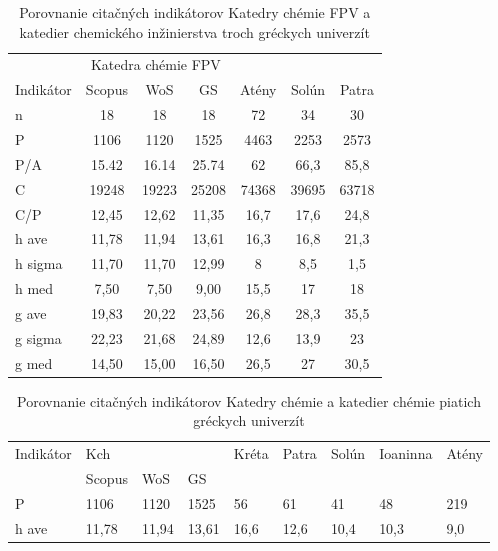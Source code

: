 \begin{SCtable}
  \label{tab:kazakis.results}

  \caption[Porovnanie Katedry chémie a katedier chemického inžinierstva troch gréckych univerzít]
  {Porovnanie citačných indikátorov Katedry chémie FPV a katedier chemického inžinierstva troch gréckych univerzít \citep{Kazakis2015}}
\begin{tabular}{lcccccc}
\toprule\noalign{\vspace{.3ex}}
           & \multicolumn{3}{c}{Katedra chémie FPV} & \multicolumn{3}{c}{\citet{Kazakis2015}}  \\
 Indikátor & Scopus & WoS   & GS    &  Atény     & Solún      & Patra      \\[0.3ex]
\midrule\noalign{\vspace{.5ex}}
 n         & 18     & 18    & 18    & 72    & 34    & 30    \\
 P         & 1106   & 1120  & 1525  & 4463  & 2253  & 2573  \\
 P/A       & 15.42  & 16.14 & 25.74 & 62    & 66,3  & 85,8  \\
 C         & 19248  & 19223 & 25208 & 74368 & 39695 & 63718 \\
 C/P       & 12,45  & 12,62 & 11,35 & 16,7  & 17,6  & 24,8  \\[1ex]
 h ave     & 11,78  & 11,94 & 13,61 & 16,3  & 16,8  & 21,3  \\
 h sigma   & 11,70  & 11,70 & 12,99 & 8     & 8,5   & 1,5   \\
 h med     & 7,50   & 7,50  & 9,00  & 15,5  & 17    & 18    \\
 g ave     & 19,83  & 20,22 & 23,56 & 26,8  & 28,3  & 35,5  \\
 g sigma   & 22,23  & 21,68 & 24,89 & 12,6  & 13,9  & 23    \\
 g med     & 14,50  & 15,00 & 16,50 & 26,5  & 27    & 30,5  \\[0.5ex]
\bottomrule
\end{tabular}
\end{SCtable}

\begin{table}
  \label{tab:lazaridis.results}
  \caption[Porovnanie Katedry chémie a chemických katedier vybraných gréckych univerzít]
  {Porovnanie citačných indikátorov Katedry chémie a katedier chémie piatich gréckych univerzít \citep{Lazaridis2010}}
\begin{tabular}{lllllll}
\hline
 Indikátor & Kch    &       &       & Kréta & Patra & Solún & Ioaninna & Atény \\
           & Scopus & WoS   & GS    &       &       &       &          &       \\
 P         & 1106   & 1120  & 1525  & 56    & 61    & 41    & 48       & 219   \\
 h ave     & 11,78  & 11,94 & 13,61 & 16,6  & 12,6  & 10,4  & 10,3     & 9,0   \\
\hline
\end{tabular}
\end{table}

